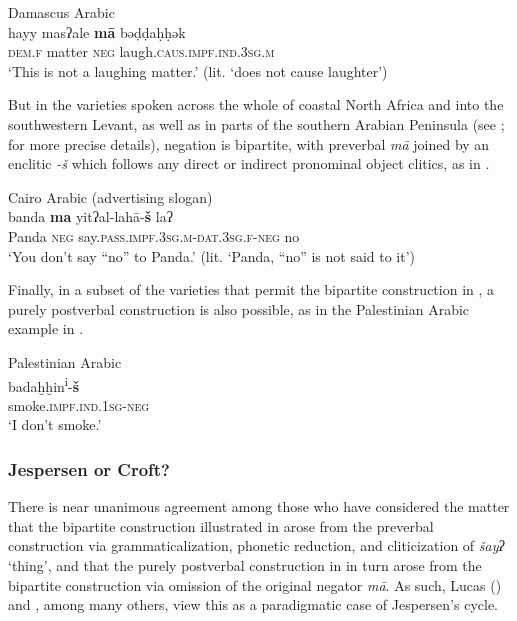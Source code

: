 \documentclass[output=paper]{langsci/langscibook}
\begin{document}
\ea\label{ex:key:dam}
{       Damascus Arabic \citep[328]{Cowell1964}}\\
\gll hayy masʔale \textbf{mā} bəḍḍaḥḥək\\
     \textsc{dem.f} matter \textsc{neg} laugh.\textsc{caus.impf.ind.3sg.m}\\
\glt ‘This is not a laughing matter.’ (lit. ‘does not cause laughter’)
\z

But in the varieties spoken across the whole of coastal North Africa and into the southwestern Levant, as well as in parts of the southern Arabian Peninsula (see \citealt{Diem2014}; \citealt{Lucas2018} for more precise details), negation is bipartite, with preverbal \textit{mā} joined by an enclitic \textit{-š} which follows any direct or indirect pronominal object clitics, as in .

\ea\label{ex:key:cai}
{       Cairo Arabic (advertising slogan)}\\
\gll banda \textbf{ma} yitʔal-lahā-\textbf{š} laʔ\\
     Panda \textsc{neg} say.\textsc{pass.impf.3sg.m-dat.3sg.f-neg} no\\
\glt ‘You don’t say “no” to Panda.’ (lit. ‘Panda, “no” is not said to it’)
\z

Finally, in a subset of the varieties that permit the bipartite construction in , a purely postverbal construction is also possible, as in the Palestinian Arabic example in .

\ea\label{ex:key:pal}

{       Palestinian Arabic \citep[147]{Seeger2013grammar}}\\
\gll badaḫḫin\textsuperscript{i}-\textbf{š}\\
     smoke.\textsc{impf.ind.1sg-neg}\\
\glt ‘I don’t smoke.’
\z




\subsubsection{Jespersen or Croft?}\label{sec:jesp}



There is near unanimous agreement among those who have considered the matter that the bipartite construction illustrated in  arose from the preverbal construction via grammaticalization, phonetic reduction, and cliticization of \textit{šayʔ} ‘thing’, and that the purely postverbal construction in  in turn arose from the bipartite construction via omission of the original negator \textit{mā}. As such, Lucas (\citeyear{Lucas2007,Lucas2009,Lucas2018}) and \citet{Diem2014}, among many others, view this as a paradigmatic case of Jespersen’s cycle. 
\end{document}
